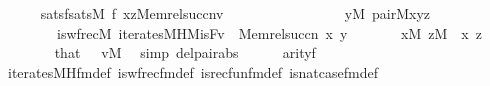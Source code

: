 \begin{isabellebody}
\ \ \ \ \isamarkupfalse%
\ satsf{\isacharcolon}{\kern0pt}{\isachardoublequoteopen}sats{\isacharparenleft}{\kern0pt}M{\isacharcomma}{\kern0pt}\ {\isacharquery}{\kern0pt}f{\isacharcomma}{\kern0pt}\ {\isacharbrackleft}{\kern0pt}x{\isacharcomma}{\kern0pt}z{\isacharcomma}{\kern0pt}Memrel{\isacharparenleft}{\kern0pt}succ{\isacharparenleft}{\kern0pt}n{\isacharparenright}{\kern0pt}{\isacharparenright}{\kern0pt}{\isacharcomma}{\kern0pt}v{\isacharbrackright}{\kern0pt}{\isacharparenright}{\kern0pt}\isanewline
\ \ \ \ \ \ \ \ {\isasymlongleftrightarrow}\isanewline
\ \ \ \ \ \ \ \ {\isacharparenleft}{\kern0pt}{\isasymexists}y{\isasymin}M{\isachardot}{\kern0pt}\ pair{\isacharparenleft}{\kern0pt}{\isacharhash}{\kern0pt}{\isacharhash}{\kern0pt}M{\isacharcomma}{\kern0pt}x{\isacharcomma}{\kern0pt}y{\isacharcomma}{\kern0pt}z{\isacharparenright}{\kern0pt}\ {\isacharampersand}{\kern0pt}\isanewline
\ \ \ \ \ \ \ \ is{\isacharunderscore}{\kern0pt}wfrec{\isacharparenleft}{\kern0pt}{\isacharhash}{\kern0pt}{\isacharhash}{\kern0pt}M{\isacharcomma}{\kern0pt}\ iterates{\isacharunderscore}{\kern0pt}MH{\isacharparenleft}{\kern0pt}{\isacharhash}{\kern0pt}{\isacharhash}{\kern0pt}M{\isacharcomma}{\kern0pt}is{\isacharunderscore}{\kern0pt}F{\isacharcomma}{\kern0pt}v{\isacharparenright}{\kern0pt}\ {\isacharcomma}{\kern0pt}\ Memrel{\isacharparenleft}{\kern0pt}succ{\isacharparenleft}{\kern0pt}n{\isacharparenright}{\kern0pt}{\isacharparenright}{\kern0pt}{\isacharcomma}{\kern0pt}\ x{\isacharcomma}{\kern0pt}\ y{\isacharparenright}{\kern0pt}{\isacharparenright}{\kern0pt}{\isachardoublequoteclose}\isanewline
\ \ \ \ \ \ \ {\isachardoublequoteopen}x{\isasymin}M{\isachardoublequoteclose}\ {\isachardoublequoteopen}z{\isasymin}M{\isachardoublequoteclose}\ \ x\ z\isanewline
\ \ \ \ \ \ \isamarkupfalse%
\ that\ {}\ {}\ {\isacartoucheopen}v{\isasymin}M{\isacartoucheclose}\ \isamarkupfalse%
\ {\isacharparenleft}{\kern0pt}simp\ del{\isacharcolon}{\kern0pt}pair{\isacharunderscore}{\kern0pt}abs{\isacharparenright}{\kern0pt}\isanewline
\ \ \ \ \isamarkupfalse%
\ {\isachardoublequoteopen}arity{\isacharparenleft}{\kern0pt}{\isacharquery}{\kern0pt}f{\isacharparenright}{\kern0pt}\ {\isacharequal}{\kern0pt}\ {}{\isachardoublequoteclose}\isanewline
\ \ \ \ \ \ \isamarkupfalse%
\ iterates{\isacharunderscore}{\kern0pt}MH{\isacharunderscore}{\kern0pt}fm{\isacharunderscore}{\kern0pt}def\ is{\isacharunderscore}{\kern0pt}wfrec{\isacharunderscore}{\kern0pt}fm{\isacharunderscore}{\kern0pt}def\ is{\isacharunderscore}{\kern0pt}recfun{\isacharunderscore}{\kern0pt}fm{\isacharunderscore}{\kern0pt}def\ is{\isacharunderscore}{\kern0pt}nat{\isacharunderscore}{\kern0pt}case{\isacharunderscore}{\kern0pt}fm{\isacharunderscore}{\kern0pt}def\isanewline

\end{isabellebody}
